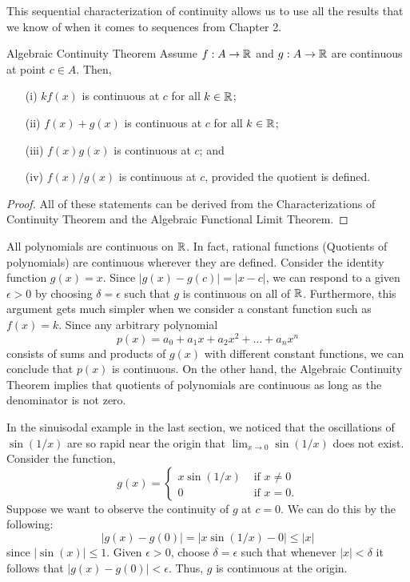 This sequential characterization of continuity allows us to use all the results that we know of when it comes to sequences from Chapter 2. 


\begin{theorem}{Algebraic Continuity Theorem}{}
    Assume \( f: A \to \mathbb{R}  \) and \( g: A \to \mathbb{R}  \) are continuous at point \( c \in A  \). Then, 
    \begin{enumerate}
        \item[(i)] \( kf(x)  \) is continuous at \( c  \) for all \( k \in \mathbb{R}  \);
        \item[(ii)] \( f(x) + g(x) \) is continuous at \( c  \) for all \( k \in \mathbb{R}  \);
        \item[(iii)] \( f(x) g(x) \) is continuous at \( c  \); and 
        \item[(iv)] \( f(x) / g(x)  \) is continuous at \( c  \), provided the quotient is defined.
    \end{enumerate}
    \end{theorem}

\begin{proof}
All of these statements can be derived from the Characterizations of Continuity Theorem and the Algebraic Functional Limit Theorem.
\end{proof}


All polynomials are continuous on \( \mathbb{R}  \). In fact, rational functions (Quotients of polynomials) are continuous wherever they are defined. Consider the identity function \( g(x) = x  \). Since \( | g(x) - g(c) | = | x - c  |  \), we can respond to a given \( \epsilon > 0 \) by choosing \( \delta = \epsilon  \) such that \( g  \) is continuous on all of \( \mathbb{R}  \). Furthermore, this argument gets much simpler when we consider a constant function such as \( f(x) = k  \). Since any arbitrary polynomial 
\[  p(x) = a_0 + a_1 x + a_2 x^2 + \dots + a_n x^n \]
consists of sums and products of \( g(x) \) with different constant functions, we can conclude that \( p(x) \) is continuous. On the other hand, the Algebraic Continuity Theorem implies that quotients of polynomials are continuous as long as the denominator is not zero.

In the sinuisodal example in the last section, we noticed that the oscillations of \( \sin (1/x ) \) are so rapid near the origin that \( \lim_{ x \to 0  } \sin (1/x) \) does not exist. Consider the function, 
\[  g(x) = 
\begin{cases}
    x \sin (1/x) &\text{~if~} x \neq 0 \\ 
    0 &\text{~if~}  x = 0. 
\end{cases} \]
Suppose we want to observe the continuity of \( g \) at \( c = 0  \). We can do this by the following:
\[ | g(x) - g(0) | = | x \sin(1/x) - 0  | \leq | x |   \]
since \( | \sin (x)  |  \leq 1 \). Given \( \epsilon > 0 \), choose \( \delta = \epsilon  \) such that whenever \( | x | < \delta \) it follows that \( | g(x) - g(0) | < \epsilon  \). Thus, \( g  \) is continuous at the origin. 


